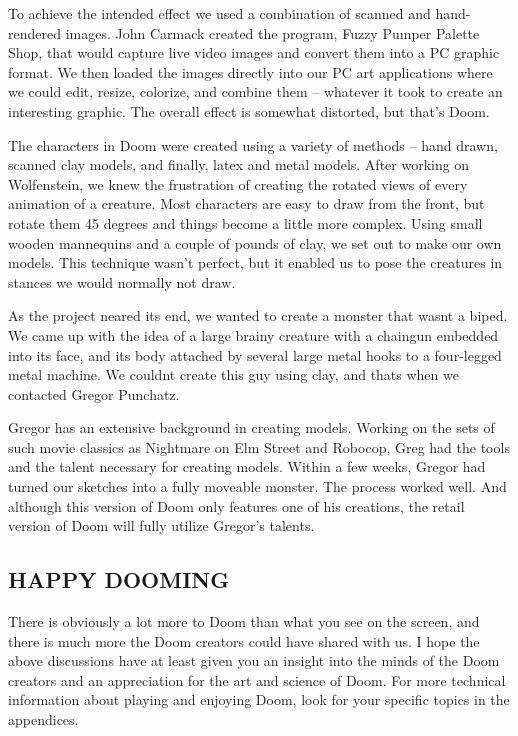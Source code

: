  To achieve the intended effect we used a combination of scanned and hand-rendered images. John Carmack created the program, Fuzzy Pumper Palette Shop, that would capture live video images and convert them into a PC graphic format. We then loaded the images directly into our PC art applications where we could edit, resize, colorize, and combine them -- whatever it took to create an interesting graphic. The overall effect is somewhat distorted, but that's Doom.\\ 
\par
 The characters in Doom were created using a variety of methods -- hand drawn, scanned clay models, and finally, latex and metal models. After working on Wolfenstein, we knew the frustration of creating the rotated views of every animation of a creature. Most characters are easy to draw from the front, but rotate them 45 degrees and things become a little more complex. Using small wooden mannequins and a couple of pounds of clay, we set out to make our own models. This technique wasn't perfect, but it enabled us to pose the creatures in stances we would normally not draw.\\
\par
As the project neared its end, we wanted to create a monster that wasnt a biped. We came up with the idea of a large brainy creature with a chaingun embedded into its face, and its body attached by several large metal hooks to a four-legged metal machine. We couldnt create this guy using clay, and thats when we contacted Gregor Punchatz.\\
\par
 Gregor has an extensive background in creating models. Working on the sets of such movie classics as Nightmare on Elm Street and Robocop, Greg had the tools and the talent necessary for creating models. Within a few weeks, Gregor had turned our sketches into a fully moveable monster. The process worked well. And although this version of Doom only features one of his creations, the retail version of Doom will fully utilize Gregor's talents.

\subsection{HAPPY DOOMING}

There is obviously a lot more to Doom than what you see on the screen, and there is much more the Doom creators could have shared with us. I hope the above discussions have at least given you an insight into the minds of the Doom creators and an appreciation for the art and science of Doom. For more technical information about playing and enjoying Doom, look for your specific topics in the appendices.\\
\par
